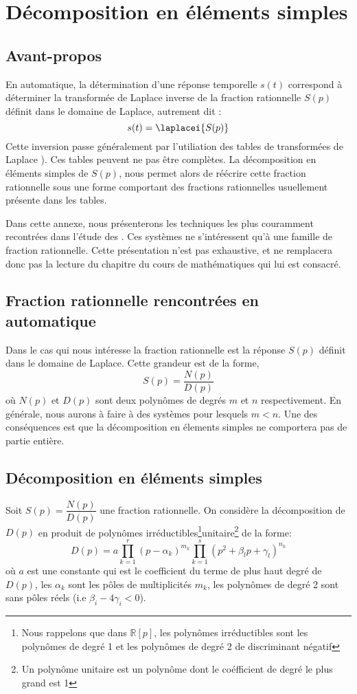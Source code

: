 \chapter{Décomposition en éléments simples\label{annexe-DES}}

\section{Avant-propos}
En automatique, la détermination d'une réponse temporelle $s(t)$
correspond à déterminer la transformée 
de Laplace inverse de la fraction rationnelle $S(p)$ 
définit dans le domaine de Laplace, autrement dit :
$$
s(t)=\laplacei{S(p)}
$$
Cette inversion passe généralement par l'utiliation des tables de transformées de Laplace ).
Ces tables peuvent ne pas être complètes. La décomposition en 
éléments simples de $S(p)$, nous permet alors de 
réécrire cette fraction rationnelle sous une forme comportant 
des fractions rationnelles usuellement présente dans les tables.

Dans cette annexe, nous présenterons les techniques les plus couramment
recontrées dans l'étude des \SLCI. Ces systèmes ne s'intéressent qu'à 
une famille de fraction rationnelle.
Cette présentation n'est pas exhaustive, et ne remplacera donc 
pas la lecture du chapitre du cours de mathématiques qui lui est consacré.

\section{Fraction rationnelle rencontrées en automatique}
Dans le cas qui nous intéresse la fraction rationnelle est la réponse $S(p)$ 
définit dans le domaine de Laplace.
Cette grandeur est de la forme,
$$
S(p)=\dfrac{N(p)}{D(p)}
$$
où $N(p)$ et $D(p)$ sont deux polynômes de degrés $m$ et $n$ respectivement.
En générale, nous aurons à faire à des systèmes pour lesquels $m<n$. 
Une des conséquences est que la décomposition en élements simples ne comportera
pas de partie entière.

\section{Décomposition en éléments simples}

Soit $S(p)=\dfrac{N(p)}{D(p)}$ une fraction rationnelle. On considère la décomposition 
de $D(p)$ en produit de polynômes irréductibles\footnote{Nous rappelons que 
dans $\mathbb{R}[p]$, les polynômes irréductibles sont 
les polynômes de degré 1 et les polynômes de degré 2 de discriminant négatif}unitaire\footnote{Un polynôme unitaire est un polynôme dont le coéfficient de degré le plus grand est 1}
de la forme:
$$
D(p)=a\prod_{k=1}^r(p-\alpha_k)^{m_k}\prod_{k=1}^s(p^2+\beta_lp+\gamma_l)^{n_k}
$$
où $a$ est une constante qui est le coefficient du terme de plus haut degré de $D(p)$, les $\alpha_k$
sont les pôles de multiplicités $m_k$,  les polynômes de degré 2 sont sans pôles réels (i.e $\beta_i-4\gamma_i<0$).

